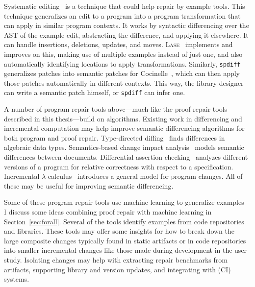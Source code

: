 Systematic editing~\cite{meng2011systematic} is a technique that could help repair by example tools.
This technique generalizes an edit to a program into a program transformation that can apply in similar program contexts.
It works by syntactic differencing over the AST of the example edit, abstracting the difference, and applying it elsewhere.
It can handle insertions, deletions, updates, and moves.
\textsc{Lase}~\cite{meng2013lase} implements and improves on this,
making use of multiple examples instead of just one, %
and also automatically identifying locations to apply transformations.
Similarly, \lstinline{spdiff}~\cite{andersen2010generic} generalizes patches into semantic patches for Cocinelle~\cite{padioleau2008documenting},
which can then apply those patches automatically in different contexts. This way, the library designer can write a semantic patch
himself, or \lstinline{spdiff} can infer one.

A number of program repair tools above---much like the proof repair tools described in this thesis---build on  algorithms.
Existing work in differencing and incremental computation may help 
improve semantic differencing algorithms for both program and proof repair.
Type-directed diffing~\cite{Miraldo:2017:TDS:3122975.3122976}
finds differences in algebraic data types.
Semantics-based change impact analysis~\cite{Autexier:2010:SCI:1860559.1860580} models semantic differences
between documents.
Differential assertion checking~\cite{differential-assertion-checking-2} analyzes different
versions of a program for relative correctness with respect to a specification.
Incremental $\lambda$-calculus~\cite{Cai:2014:TCH:2594291.2594304} introduces a general model for program changes.
All of these may be useful for improving semantic differencing.

Some of these program repair tools use machine learning to generalize examples---I discuss some ideas combining proof repair
with machine learning in Section~\ref{sec:forall}.
Several of the tools identify examples from code repositories and libraries.
These tools may offer some insights for how to break down the large composite changes typically found in static artifacts or in code repositories
into smaller incremental changes like those made during development in the  user study.
Isolating changes may help with extracting repair benchmarks from artifacts, supporting library and version
updates, and integrating with  (CI) systems.

